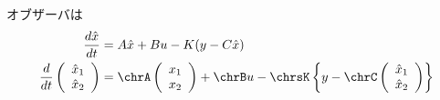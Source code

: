 オブザーバは
\begin{align*}
 \frac{d \hat{x}}{dt} &= A \hat{x} + B u - K (y - C \hat{x})
\\
 \frac{d}{dt}
	\left (
	\begin{array}{c}
	 \hat{x}_1 \\ \hat{x}_2 
	\end{array}
	\right )
	&=
	\chrA \state
	+ 
	\chrB u
	-
	\chrsK
	\left \{
		y -
			\chrC
			\left (
			\begin{array}{c}
			 \hat{x}_1 \\ \hat{x}_2 
			\end{array}
			\right )
	\right \}
\end{align*}






